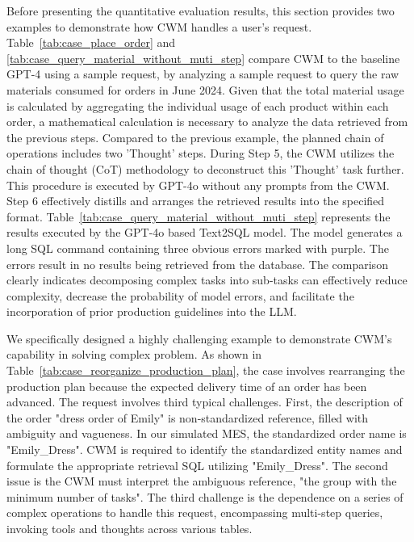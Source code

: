 \documentclass[preprint,12pt]{elsarticle}
\begin{document}
Before presenting the quantitative evaluation results, this section provides two examples to demonstrate how CWM handles a user's request.
Table~\ref{tab:case_place_order} and \ref{tab:case_query_material_without_muti_step} compare CWM to the baseline GPT-4 using a sample request, by analyzing a sample request to query the raw materials consumed for orders in June 2024.
Given that the total material usage is calculated by aggregating the individual usage of each product within each order, a mathematical calculation is necessary to analyze the data retrieved from the previous steps. 
Compared to the previous example, the planned chain of operations includes two 'Thought' steps. 
During Step 5, the CWM utilizes the chain of thought (CoT) methodology to deconstruct this 'Thought' task further. 
This procedure is executed by GPT-4o without any prompts from the CWM. 
Step 6 effectively distills and arranges the retrieved results into the specified format.
Table~\ref{tab:case_query_material_without_muti_step} represents the results executed by the GPT-4o based Text2SQL model. 
The model generates a long SQL command containing three obvious errors marked with purple.
The errors result in no results being retrieved from the database.
The comparison clearly indicates decomposing complex tasks into sub-tasks can effectively reduce complexity, decrease the probability of model errors, and facilitate the incorporation of prior production guidelines into the LLM.


We specifically designed a highly challenging example to demonstrate CWM's capability in solving complex problem.
As shown in Table~\ref{tab:case_reorganize_production_plan}, the case involves rearranging the production plan because the expected delivery time of an order has been advanced.
The request involves third typical challenges.
First, the description of the order "dress order of Emily" is non-standardized reference, filled with ambiguity and vagueness.
In our simulated MES, the standardized order name is "Emily\_Dress".
CWM is required to identify the standardized entity names and formulate the appropriate retrieval SQL utilizing "Emily\_Dress". 
The second issue is the CWM must interpret the ambiguous reference, "the group with the minimum number of tasks".
The third challenge is the dependence on a series of complex operations to handle this request, encompassing multi-step queries, invoking tools and thoughts across various tables.
\end{document}

